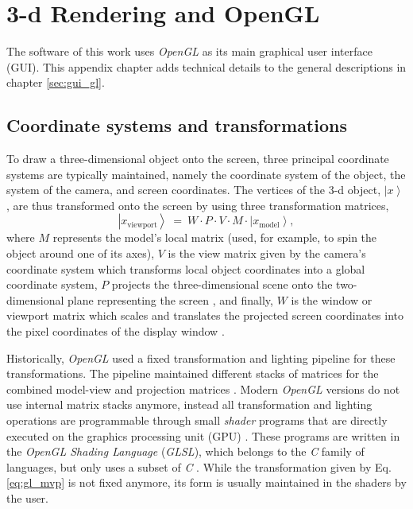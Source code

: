 %
%

\chapter{3-d Rendering and OpenGL}
\label{ch:gl}

The software of this work uses \textit{OpenGL} \cite{web_OpenGL} as its main graphical user interface (GUI).
This appendix chapter adds technical details to the general descriptions in chapter \ref{sec:gui_gl}.



\section{Coordinate systems and transformations}

To draw a three-dimensional object onto the screen, three principal coordinate systems are typically maintained,
namely the coordinate system of the object, the system of the camera, and screen coordinates.
The vertices of the 3-d object, $\left|x\right>$ , are thus transformed onto the screen by using three
transformation matrices,
\begin{equation}
	\boxed{\left|x_{\mathrm{viewport}}\right> \ =\ W \cdot P \cdot V \cdot  M \cdot  \left| x_{\mathrm{model}} \right>,}
	\label{eq:gl_mvp}
\end{equation}
where $M$ represents the model's local matrix (used, for example, to spin the object around one of its axes),
$V$ is the view matrix given by the camera's coordinate system which transforms local object coordinates into
a global coordinate system, $P$ projects the three-dimensional scene onto the two-dimensional plane
representing the screen \cite{web_gl_ortho, web_gl_perspective}, and finally, $W$ is the window or viewport 
matrix which scales and translates the projected screen coordinates into the pixel coordinates of the 
display window \cite{web_gl_viewport}.

Historically, \textit{OpenGL} used a fixed transformation and lighting pipeline \cite{wiki_gl_history} for
these transformations. The pipeline maintained different stacks of matrices for the combined model-view and
projection matrices \cite{web_gl_matrixmode}.
Modern \textit{OpenGL} versions do not use internal matrix stacks anymore, instead all transformation
and lighting operations are programmable through small \textit{shader} programs that are directly executed on
the graphics processing unit (GPU) \cite{wiki_gl_history}. These programs are written in the
\textit{OpenGL Shading Language} (\textit{GLSL}), which belongs to the \textit{C} family of languages, but
only uses a subset of \textit{C} \cite{wiki_glsl}.
While the transformation given by Eq. \ref{eq:gl_mvp} is not fixed anymore, its form is usually maintained
in the shaders by the user.

